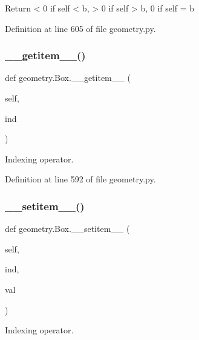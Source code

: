 \begin{DoxyVerb}Return < 0 if self < b, 
  > 0 if self > b,
    0 if self = b
\end{DoxyVerb}
 

Definition at line 605 of file geometry.\+py.

\mbox{\label{classgeometry_1_1Box_a9fed11ac430eeb493f1f9101ed50e570}} 
\subsubsection{\texorpdfstring{\+\_\+\+\_\+getitem\+\_\+\+\_\+()}{\_\_getitem\_\_()}}
{\footnotesize\ttfamily def geometry.\+Box.\+\_\+\+\_\+getitem\+\_\+\+\_\+ (\begin{DoxyParamCaption}\item[{}]{self,  }\item[{}]{ind }\end{DoxyParamCaption})}

\begin{DoxyVerb}Indexing operator.\end{DoxyVerb}
 

Definition at line 592 of file geometry.\+py.

\mbox{\label{classgeometry_1_1Box_afa830f6acc2fe66f4e9fb8a27921570f}} 
\subsubsection{\texorpdfstring{\+\_\+\+\_\+setitem\+\_\+\+\_\+()}{\_\_setitem\_\_()}}
{\footnotesize\ttfamily def geometry.\+Box.\+\_\+\+\_\+setitem\+\_\+\+\_\+ (\begin{DoxyParamCaption}\item[{}]{self,  }\item[{}]{ind,  }\item[{}]{val }\end{DoxyParamCaption})}

\begin{DoxyVerb}Indexing operator.\end{DoxyVerb}
 

